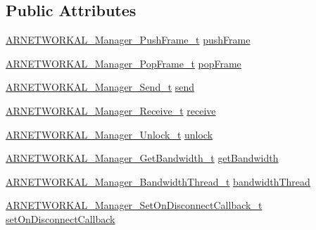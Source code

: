 \subsection*{Public Attributes}
\begin{DoxyCompactItemize}
\item 
\hyperlink{_a_r_n_e_t_w_o_r_k_a_l___manager_8h_a3979cdad4777c5d5df284a4786b6aa40}{A\+R\+N\+E\+T\+W\+O\+R\+K\+A\+L\+\_\+\+Manager\+\_\+\+Push\+Frame\+\_\+t} \hyperlink{struct_a_r_n_e_t_w_o_r_k_a_l___manager__t_aa280a580654ff3f1349280650d0d7fa1}{push\+Frame}
\item 
\hyperlink{_a_r_n_e_t_w_o_r_k_a_l___manager_8h_a1fae288ada7c62234d13b1980610b8c5}{A\+R\+N\+E\+T\+W\+O\+R\+K\+A\+L\+\_\+\+Manager\+\_\+\+Pop\+Frame\+\_\+t} \hyperlink{struct_a_r_n_e_t_w_o_r_k_a_l___manager__t_a60838d4f20e0c3ddb9c1b0911fedf278}{pop\+Frame}
\item 
\hyperlink{_a_r_n_e_t_w_o_r_k_a_l___manager_8h_abe660667f7d1aaaff06d6b7d0502af96}{A\+R\+N\+E\+T\+W\+O\+R\+K\+A\+L\+\_\+\+Manager\+\_\+\+Send\+\_\+t} \hyperlink{struct_a_r_n_e_t_w_o_r_k_a_l___manager__t_a8f0c77f009439f29e93479f93fe22571}{send}
\item 
\hyperlink{_a_r_n_e_t_w_o_r_k_a_l___manager_8h_a99d750916175141c6541cb125adc9103}{A\+R\+N\+E\+T\+W\+O\+R\+K\+A\+L\+\_\+\+Manager\+\_\+\+Receive\+\_\+t} \hyperlink{struct_a_r_n_e_t_w_o_r_k_a_l___manager__t_a3e364aaebef8eaf75d10b2463475fe58}{receive}
\item 
\hyperlink{_a_r_n_e_t_w_o_r_k_a_l___manager_8h_a7e35e4ec7b12510305fda4845a34dfc1}{A\+R\+N\+E\+T\+W\+O\+R\+K\+A\+L\+\_\+\+Manager\+\_\+\+Unlock\+\_\+t} \hyperlink{struct_a_r_n_e_t_w_o_r_k_a_l___manager__t_a7f6b9075bf58e6361b5c7efff6c73ea6}{unlock}
\item 
\hyperlink{_a_r_n_e_t_w_o_r_k_a_l___manager_8h_a4c408931d7082d13fed30b282a496c66}{A\+R\+N\+E\+T\+W\+O\+R\+K\+A\+L\+\_\+\+Manager\+\_\+\+Get\+Bandwidth\+\_\+t} \hyperlink{struct_a_r_n_e_t_w_o_r_k_a_l___manager__t_ae91349a73faa0bdd8ddc1501d6f941ab}{get\+Bandwidth}
\item 
\hyperlink{_a_r_n_e_t_w_o_r_k_a_l___manager_8h_a803878f98588b3b49ec3c8bd5598dd78}{A\+R\+N\+E\+T\+W\+O\+R\+K\+A\+L\+\_\+\+Manager\+\_\+\+Bandwidth\+Thread\+\_\+t} \hyperlink{struct_a_r_n_e_t_w_o_r_k_a_l___manager__t_a9224cc47701447b2c76f19665de8df75}{bandwidth\+Thread}
\item 
\hyperlink{_a_r_n_e_t_w_o_r_k_a_l___manager_8h_aa0506b63982d2e721d2de54068675857}{A\+R\+N\+E\+T\+W\+O\+R\+K\+A\+L\+\_\+\+Manager\+\_\+\+Set\+On\+Disconnect\+Callback\+\_\+t} \hyperlink{struct_a_r_n_e_t_w_o_r_k_a_l___manager__t_a1dfd31690dafb47f032af3e55e866e9c}{set\+On\+Disconnect\+Callback}

\end{DoxyCompactItemize}
